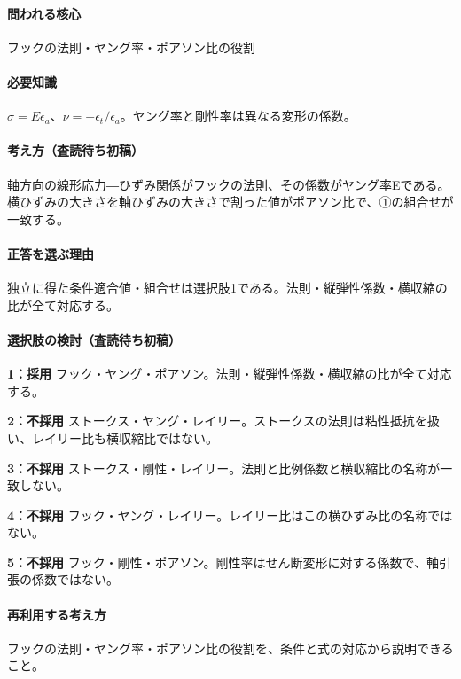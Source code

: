 \paragraph{問われる核心} フックの法則・ヤング率・ポアソン比の役割

\paragraph{必要知識} \(\sigma=E\epsilon_a\)、\(\nu=-\epsilon_t/\epsilon_a\)。ヤング率と剛性率は異なる変形の係数。

\paragraph{考え方（査読待ち初稿）} 軸方向の線形応力―ひずみ関係がフックの法則、その係数がヤング率Eである。横ひずみの大きさを軸ひずみの大きさで割った値がポアソン比で、①の組合せが一致する。

\paragraph{正答を選ぶ理由} 独立に得た条件適合値・組合せは選択肢1である。法則・縦弾性係数・横収縮の比が全て対応する。

\paragraph{選択肢の検討（査読待ち初稿）}\mbox{}\par

\noindent\textbf{1：採用} フック・ヤング・ポアソン。法則・縦弾性係数・横収縮の比が全て対応する。\par

\noindent\textbf{2：不採用} ストークス・ヤング・レイリー。ストークスの法則は粘性抵抗を扱い、レイリー比も横収縮比ではない。\par

\noindent\textbf{3：不採用} ストークス・剛性・レイリー。法則と比例係数と横収縮比の名称が一致しない。\par

\noindent\textbf{4：不採用} フック・ヤング・レイリー。レイリー比はこの横ひずみ比の名称ではない。\par

\noindent\textbf{5：不採用} フック・剛性・ポアソン。剛性率はせん断変形に対する係数で、軸引張の係数ではない。\par

\paragraph{再利用する考え方} フックの法則・ヤング率・ポアソン比の役割を、条件と式の対応から説明できること。

